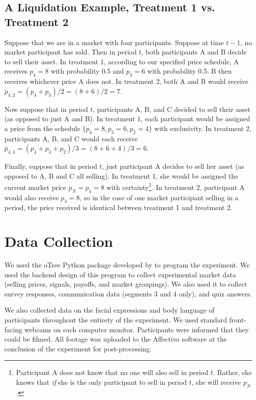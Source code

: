 \documentclass[thesis]{uathesis}
\begin{document}
\begin{body}
\subsection{A Liquidation Example, Treatment 1 vs. Treatment 2}
Suppose that we are in a market with four participants. Suppose at time $t-1$, no market participant has sold. Then in period $t$, both participants A and B decide to sell their asset. In treatment 1, according to our specified price schedule, A receives $p_4 = 8$ with probability 0.5 and $p_3 = 6$ with probability 0.5. B then receives whichever price A does not. In treatment 2, both A and B would receive $\bar{p}_{4,2} = (p_4+p_3)/2 = (8+6)/2 = 7$.

Now suppose that in period $t$, participants A, B, and C decided to sell their asset (as opposed to just A and B). In treatment 1, each participant would be assigned a price from the schedule $\{p_4=8,p_3=6,p_2=4\}$ with exclusivity. In treatment 2, participants A, B, and C would each receive $\bar{p}_{4,3} = (p_4+p_3+p_2)/3 = (8+6+4)/3 = 6$.

Finally, suppose that in period $t$, just participant A decides to sell her asset (as opposed to A, B and C all selling). In treatment 1, she would be assigned the current market price $p_N = p_4 = 8$ with certainty\footnote{Participant A does not know that no one will also sell in period $t$. Rather, she knows that \textit{if} she is the only participant to sell in period $t$, she will receive $p_N$.}. In treatment 2, participant A would also receive $p_4 = 8$, so in the case of one market participant selling in a period, the price received is identical between treatment 1 and treatment 2.

\section{Data Collection}
We used the oTree  Python package developed by \cite{otree} to program the experiment. We used the backend design of this program to collect experimental market data (selling prices, signals, payoffs, and market groupings). We also used it to collect survey responses, communication data (segments 3 and 4 only), and quiz answers.

We also collected data on the facial expressions and body language of participants throughout the entirety of the experiment. We used standard front-facing webcams on each computer monitor. Participants were informed that they could be filmed. All footage was uploaded to the Affectiva software at the conclusion of the experiment for post-processing.


\end{body}
\end{document}
